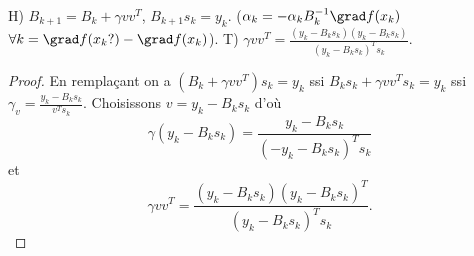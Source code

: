 \begin{mytheo}
  H) $B_{k+1} = B_k + \gamma v v^T$, $B_{k+1} s_k = y_k$.
  ($\alpha_k = -\alpha_k B_k^{-1} \grad f(x_k)$
  $\forall k =\grad f(x_k?)-\grad f(x_k)$).
  T) $\gamma v v^T = \frac{(y_k-B_ks_k)(y_k-B_ks_k)}{(y_k-B_ks_k)^Ts_k}$.
  \begin{proof}
    En remplaçant on a $(B_k + \gamma vv^T)s_k = y_k$ ssi
    $B_ks_k + \gamma v v^T s_k = y_k$ ssi
    $\gamma_v = \frac{y_k-B_ks_k}{v^Ts_k}$.
    Choisissons $v=y_k-B_ks_k$
    d'où
    \[ \gamma(y_k-B_ks_k) = \frac{y_k-B_ks_k}{(-y_k-B_ks_k)^Ts_k} \]
    et
    \[ \gamma vv^T = \frac{(y_k-B_ks_k)(y_k-B_ks_k)^T}{(y_k-B_ks_k)^Ts_k}. \]
  \end{proof}
\end{mytheo}


